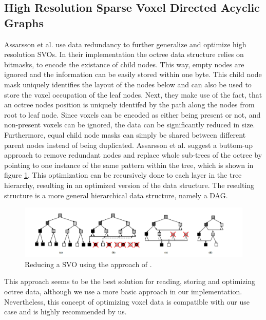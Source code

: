 \subsection{High Resolution Sparse Voxel Directed Acyclic Graphs} \label{subsec-highres-svo-dags}

Assarsson et al. \cite{Assarsson2013} use data redundancy to further generalize and optimize high resolution 
\ac{SVO}s. In their implementation the octree data structure relies on bitmasks, to encode the existance of child 
nodes. This way, empty nodes are ignored and the information can be easily stored within one byte. This child node 
mask uniquely identifies the layout of the nodes below and can also be used to store the voxel occupation of the 
leaf nodes. Next, they make use of the fact, that an octree nodes position is uniquely identifed by the path along 
the nodes from root to leaf node. Since voxels can be encoded as either being present or not, and non-present 
voxels can be ignored, the data can be significantly reduced in size. Furthermore, equal child node masks 
can simply be shared between different parent nodes instead of being duplicated. Assarsson et al. \cite{Assarsson2013} 
suggest a buttom-up approach to remove redundant nodes and replace whole sub-trees of the octree by pointing to one 
instance of the same pattern within the tree, which is shown in figure \ref{fig:sparse-voxel-dag-creation}. 
This optimization can be recursively done to each layer in the tree hierarchy, resulting in an optimized version 
of the data structure. The resulting structure is a more general hierarchical data structure, namely a \ac{DAG}.

\begin{figure}[h]
    \centering
    \includegraphics[width=\linewidth]{images/graphics/highres-sv-dag.png}
    \caption{Reducing a \ac{SVO} using the approach of \cite{Assarsson2013}.}
    \label{fig:sparse-voxel-dag-creation}
\end{figure}

\noindent
This approach seems to be the best solution for reading, storing and optimizing octree data, although we use 
a more basic approach in our implementation. Nevertheless, this concept of optimizing voxel data is compatible 
with our use case and is highly recommended by us.

